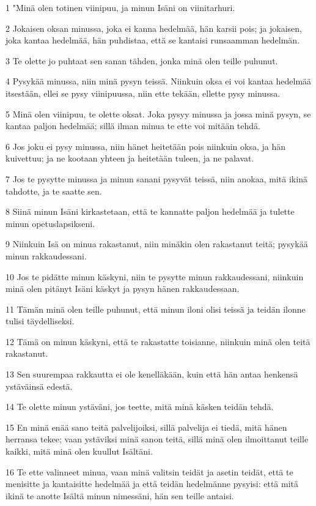 \par 1 "Minä olen totinen viinipuu, ja minun Isäni on viinitarhuri.
\par 2 Jokaisen oksan minussa, joka ei kanna hedelmää, hän karsii pois; ja jokaisen, joka kantaa hedelmää, hän puhdistaa, että se kantaisi runsaamman hedelmän.
\par 3 Te olette jo puhtaat sen sanan tähden, jonka minä olen teille puhunut.
\par 4 Pysykää minussa, niin minä pysyn teissä. Niinkuin oksa ei voi kantaa hedelmää itsestään, ellei se pysy viinipuussa, niin ette tekään, ellette pysy minussa.
\par 5 Minä olen viinipuu, te olette oksat. Joka pysyy minussa ja jossa minä pysyn, se kantaa paljon hedelmää; sillä ilman minua te ette voi mitään tehdä.
\par 6 Jos joku ei pysy minussa, niin hänet heitetään pois niinkuin oksa, ja hän kuivettuu; ja ne kootaan yhteen ja heitetään tuleen, ja ne palavat.
\par 7 Jos te pysytte minussa ja minun sanani pysyvät teissä, niin anokaa, mitä ikinä tahdotte, ja te saatte sen.
\par 8 Siinä minun Isäni kirkastetaan, että te kannatte paljon hedelmää ja tulette minun opetuslapsikseni.
\par 9 Niinkuin Isä on minua rakastanut, niin minäkin olen rakastanut teitä; pysykää minun rakkaudessani.
\par 10 Jos te pidätte minun käskyni, niin te pysytte minun rakkaudessani, niinkuin minä olen pitänyt Isäni käskyt ja pysyn hänen rakkaudessaan.
\par 11 Tämän minä olen teille puhunut, että minun iloni olisi teissä ja teidän ilonne tulisi täydelliseksi.
\par 12 Tämä on minun käskyni, että te rakastatte toisianne, niinkuin minä olen teitä rakastanut.
\par 13 Sen suurempaa rakkautta ei ole kenelläkään, kuin että hän antaa henkensä ystäväinsä edestä.
\par 14 Te olette minun ystäväni, jos teette, mitä minä käsken teidän tehdä.
\par 15 En minä enää sano teitä palvelijoiksi, sillä palvelija ei tiedä, mitä hänen herransa tekee; vaan ystäviksi minä sanon teitä, sillä minä olen ilmoittanut teille kaikki, mitä minä olen kuullut Isältäni.
\par 16 Te ette valinneet minua, vaan minä valitsin teidät ja asetin teidät, että te menisitte ja kantaisitte hedelmää ja että teidän hedelmänne pysyisi: että mitä ikinä te anotte Isältä minun nimessäni, hän sen teille antaisi.
